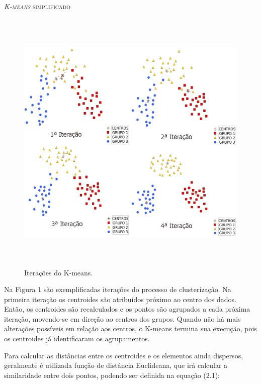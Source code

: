 \documentclass[12pt,openright,oneside,a4paper,english,spanish,brazil]{unifil}
\begin{document}
\begin{algorithm}[H]
\caption{\textsc{\textit{K-means} simplificado}}
\end{algorithm}
\vspace{0.4cm}

\begin{figure}[!h]
\centering
\includegraphics[width = 15cm, height = 13cm]{figuras/kmeans.png}
\caption{\scriptsize{Iterações do K-means.}}
\end{figure}

\indent Na Figura 1 são exemplificadas iterações do processo de clusterização. Na primeira iteração os centroides são atribuídos próximo ao centro dos dados. Então, os centroides são recalculados e os pontos são agrupados a cada próxima iteração, movendo-se em direção ao centros dos grupos. Quando não há mais alterações possíveis em relação aos centros, o K-means termina sua execução, pois os centroides já identificaram os agrupamentos. 

\indent Para calcular as distâncias entre os centroides e os elementos ainda dispersos, geralmente é utilizada função de distância Euclideana, que irá calcular a similaridade entre dois pontos, podendo ser definida na equação (2.1):
\end{document}
